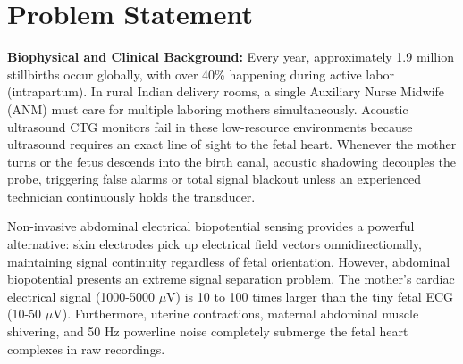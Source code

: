 \documentclass[10pt,a4paper]{article}
\begin{document}
\vspace{0.6em}

\section{Problem Statement}

\noindent
{}

\vspace{0.5em}
\noindent
\textbf{Biophysical and Clinical Background:} Every year, approximately 1.9 million stillbirths occur globally, with over 40\% happening during active labor (intrapartum). In rural Indian delivery rooms, a single Auxiliary Nurse Midwife (ANM) must care for multiple laboring mothers simultaneously. Acoustic ultrasound CTG monitors fail in these low-resource environments because ultrasound requires an exact line of sight to the fetal heart. Whenever the mother turns or the fetus descends into the birth canal, acoustic shadowing decouples the probe, triggering false alarms or total signal blackout unless an experienced technician continuously holds the transducer.

Non-invasive abdominal electrical biopotential sensing provides a powerful alternative: skin electrodes pick up electrical field vectors omnidirectionally, maintaining signal continuity regardless of fetal orientation. However, abdominal biopotential presents an extreme signal separation problem. The mother's cardiac electrical signal (1000-5000 $\mu$V) is 10 to 100 times larger than the tiny fetal ECG (10-50 $\mu$V). Furthermore, uterine contractions, maternal abdominal muscle shivering, and 50 Hz powerline noise completely submerge the fetal heart complexes in raw recordings.
\end{document}
